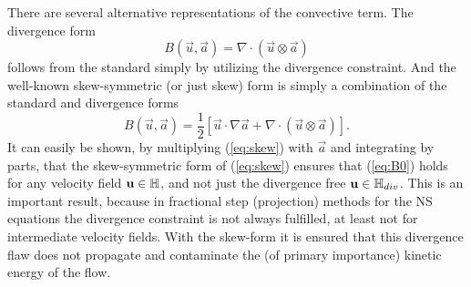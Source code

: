 There are several alternative representations of the convective term. The divergence form
\begin{equation}
B(\vec{u},\vec{a})=\nabla \cdot (\vec{u} \otimes \vec{a})
\end{equation}
follows from the standard simply by utilizing the divergence constraint. And the well-known skew-symmetric (or just skew) form is simply a combination of the standard and divergence forms
\begin{equation}
 B(\vec{u},\vec{a}) = \frac{1}{2}\left[ \vec{u}\cdot \nabla \vec{a} + \nabla \cdot (\vec{u} \otimes \vec{a}) \right].
\label{eq:skew}
\end{equation}
It can easily be shown, by multiplying (\ref{eq:skew}) with $\vec{a}$ and integrating by parts, that the skew-symmetric form of (\ref{eq:skew}) ensures that (\ref{eq:B0}) holds for any velocity field $\mathbf{ u } \in \mathbb{H}$, and not just the divergence free $\mathbf{ u } \in \mathbb{H}_{div}$. This is an important result, because in fractional step (projection) methods for the NS equations the divergence constraint is not always fulfilled, at least not for intermediate velocity fields. With the skew-form it is ensured that this divergence flaw does not propagate and contaminate the (of primary importance) kinetic energy of the flow.


